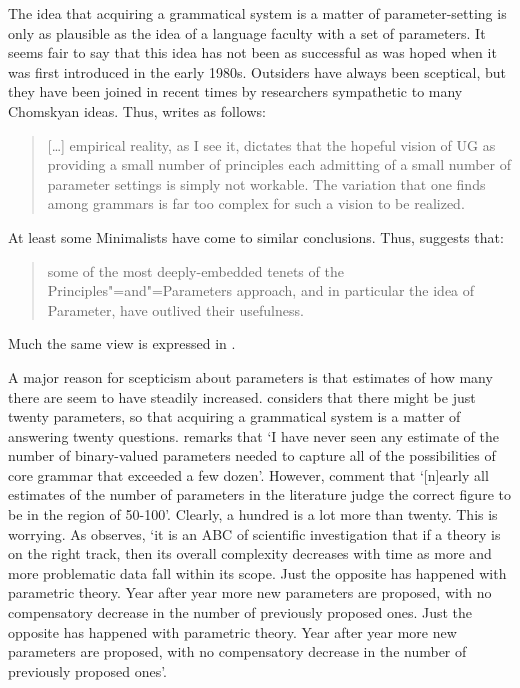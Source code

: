 \documentclass[output=paper]{langsci/langscibook}
\begin{document}
The idea that acquiring a grammatical system is a matter of parameter-setting is only as plausible
as the idea of a language faculty with a set of parameters. It seems fair to say that this idea has
not been as successful as was hoped when it was first introduced in the early 1980s.  Outsiders have
always been sceptical, but they have been joined in recent times by researchers sympathetic to many
Chomskyan ideas. Thus, \citet[]{Newmeyer2005a} writes as follows:

\begin{quotation}
[\ldots] empirical reality, as I see it, dictates that the hopeful vision of UG as providing a small
number of principles each admitting of a small number of parameter settings is simply not
workable. The variation that one finds among grammars is far too complex for such a vision to be
realized.
\end{quotation}

At least some Minimalists have come to similar conclusions. Thus, \citet[]{Boeckx2011a-u} suggests that:
\begin{quotation}
some of the most deeply-embedded tenets of the Principles"=and"=Parameters approach, and in particular
the idea of Parameter, have outlived their usefulness. \citep[]{Boeckx2011a-u}
\end{quotation}
%
Much the same view is expressed in .

A major reason for scepticism about parameters is that estimates of how many there are seem to have
steadily increased. \citet{Fodor2003a-u} considers that there might be just twenty parameters, so that
acquiring a grammatical system is a matter of answering twenty questions. \citet[]{Newmeyer2005a} remarks that ‘I have never seen any estimate of the number of binary-valued
parameters needed to capture all of the possibilities of core grammar that exceeded a few
dozen’. However, \citet{RH2005a} comment that ‘[n]early all estimates of the number of
parameters in the literature judge the correct figure to be in the region of 50-100’. Clearly, a
hundred is a lot more than twenty. This is worrying. As \citet[]{Newmeyer2006a-u} observes, ‘it
is an ABC of scientific investigation that if a theory is on the right track, then its overall
complexity decreases with time as more and more problematic data fall within its scope. Just the
opposite has happened with parametric theory. Year after year more new parameters are proposed, with
no compensatory decrease in the number of previously proposed ones. Just the opposite has happened
with parametric theory. Year after year more new parameters are proposed, with no compensatory
decrease in the number of previously proposed ones’.
\end{document}
